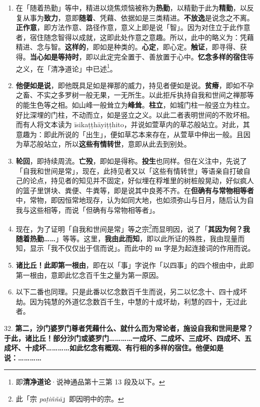 \begin{enumerate}\item 在「随着热勤」等中，精进以烧焦烦恼被称为\textbf{热勤}，以精勤于此为\textbf{精勤}，以反复从事为\textbf{致力}，意即\textbf{随着}、凭藉、依据如是三类精进。\textbf{不放逸}是说念之不离。\textbf{正作意}，即方法作意、路径作意，意义上即是说「智」。因为对住立于此作意者，宿住随念智得以成就，这即此处作意之意趣。所以，此中的略义为：凭藉精进、念与智。\textbf{这样的}，即如是种类的。\textbf{心定}，即心定。\textbf{触证}，即寻得、获得。\textbf{当心如是等持时}，即以此定完全置于、善放置于心中。\textbf{忆念多样的宿住}等之义，在「清净道论」中已述\footnote{即\textbf{清净道论}·说神通品第十三第 13 段及以下。}。
\item \textbf{他便如是说}，即他既具足如是禅那的威力，持见者便如是说。\textbf{贫瘠}，即如不孕之畜、不实之多罗树一般无果，一无所生。以此拒斥执持自我和世间之禅那等的能生色等之相。如山峰一般耸立为\textbf{峰耸}。\textbf{柱立}，如城门柱一般竖立为柱立。好比深埋的门柱，不动而立，如是竖立之义。以此二者表明世间的不败坏相。而有人将文本读为 īsikaṭṭhāyiṭṭhito，并说如萱草内的草芯般站立。对此，其意趣为：即此所说的「出生」，便如草芯本来存在，从萱草中伸出一般。且因为草芯般站立，所以\textbf{这些有情转世}，意即从此去到别处。
\item \textbf{轮回}，即持续周流。\textbf{亡殁}，即如是得称。\textbf{投生}也同样。但在义注中，先说了「自我和世间是常」，现在，此持见者又以「这些有情转世」等语亲自打破自己的论点，持见者的知见并不固定，好似埋在稃堆里的树桩般晃动，好似疯人的篮子里饼块、粪便、牛粪等，即是说其中良莠不齐。在\textbf{但确有与常物相等者}中，常物，即因恒常地现存，认为如同大地，也如须弥山与日月，随后认为自我与这些相等，而说「但确有与常物相等者」。
\item 现在，为了证明「自我和世间是常」等之宗\footnote{此「宗 \textit{paṭiññā}」即因明中的宗。}而显明因，说了「\textbf{其因为何？我随着热勤……}」等等。这里，\textbf{我由此而知}，即以此所证的殊胜，我由现量而知，显示「我不仅仅出于信而说」。而此中的 \textbf{m} 字是为起连接词的作用而说。
\item \textbf{诸比丘！此即第一根由}，即在以「事」字说作「以四事」的四个根由中，此即第一根由，意即此忆念百千生之量为第一原因。
\item 以下二番也同理。只是此番以忆念数百千生而说，另二以忆念十、四十成坏劫。因为钝慧的外道忆念数百千生，中慧的十成坏劫，利慧的四十，无过此者。\end{enumerate}

{\Large 32.} \textbf{第二，沙门婆罗门尊者凭藉什么、就什么而为常论者，施设自我和世间是常？于此，诸比丘！部分沙门或婆罗门…………一成坏、二成坏、三成坏、四成坏、五成坏、十成坏…………如此忆念有概观、有行相的多样的宿住。他便如是说：…………}

